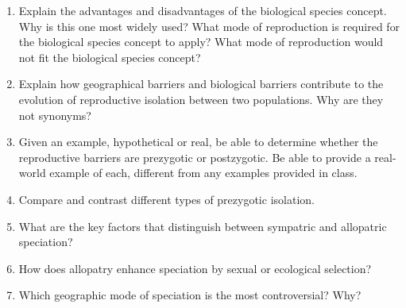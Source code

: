 \documentclass[letterpaper]{tufte-handout}
\begin{document}
\begin{enumerate}
	\item Explain the advantages and disadvantages of the biological species concept.  Why is this one most widely used?  What mode of reproduction is required for the biological species concept to apply?  What mode of reproduction would not fit the biological species concept?

	\item Explain how geographical barriers and biological barriers contribute to the evolution of reproductive isolation between two populations.  Why are they not synonyms?

	\item Given an example, hypothetical or real, be able to determine whether the reproductive barriers are prezygotic or postzygotic.  Be able to provide a real-world example of each, different from any examples provided in class.

	\item Compare and contrast different types of prezygotic isolation.

	\item What are the key factors that distinguish between sympatric and allopatric speciation?

	\item How does allopatry enhance speciation by sexual or ecological selection?

	\item Which geographic mode of speciation is the most controversial?  Why?

\end{enumerate}
\end{document}
